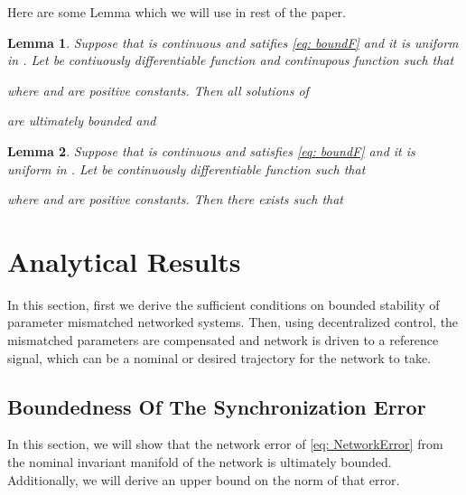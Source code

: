 \documentclass[conference]{IEEEtran}
\newtheorem{lemma}{Lemma}
\begin{document}
Here are some Lemma which we will use in rest of the paper.
	


	\begin{lemma}\cite[Theorem 4. 8]{Khalil02}\label{Lemma: asymptotic W}
		 Suppose that  is continuous and satifies \eqref{eq: boundF} and it is uniform in . Let  be contiuously differentiable function and continupous function  such that
		 
		 where  and  are positive constants. Then all solutions of 
		 
		 are ultimately bounded and 
		 
	 \end{lemma}
	\begin{lemma}\cite[Theorem 4. 10]{Khalil02}\label{Lemma: Bounded x}
		 Suppose that  is continuous and satisfies \eqref{eq: boundF} and it is uniform in . Let  be continuously differentiable function such that
		 
		 where  and  are positive constants. Then there exists  such that 
		 
	 \end{lemma}	
\section{Analytical Results}
In this section, first we derive the sufficient conditions on bounded stability of parameter mismatched networked systems. Then, using decentralized control, the mismatched parameters are compensated and network is driven to a reference signal, which can be a nominal or desired trajectory for the network to take.
\subsection{Boundedness Of The Synchronization Error}
	In this section, we will show that the network error of \eqref{eq: NetworkError} from the nominal invariant manifold of the network is ultimately bounded. Additionally, we will derive an upper bound on the norm of that error.
	
\end{document}
